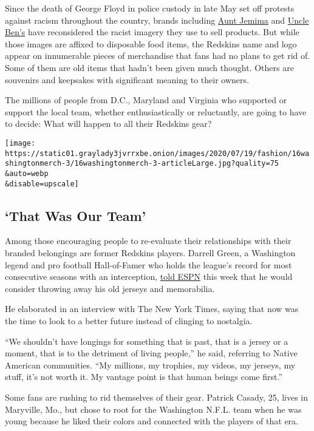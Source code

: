Since the death of George Floyd in police custody in late May set off
protests against racism throughout the country, brands including
\href{https://www.nytimes3xbfgragh.onion/2020/06/17/business/media/aunt-jemima-racial-stereotype.html}{Aunt
Jemima} and
\href{https://www.nytimes3xbfgragh.onion/2020/06/17/business/aunt-jemima-mrs-butterworth-uncle-ben.html}{Uncle
Ben's} have reconsidered the racist imagery they use to sell products.
But while those images are affixed to disposable food items, the
Redskins name and logo appear on innumerable pieces of merchandise that
fans had no plans to get rid of. Some of them are old items that hadn't
been given much thought. Others are souvenirs and keepsakes with
significant meaning to their owners.

The millions of people from D.C., Maryland and Virginia who supported or
support the local team, whether enthusiastically or reluctantly, are
going to have to decide: What will happen to all their Redskins gear?

\texttt{[image: https://static01.graylady3jvrrxbe.onion/images/2020/07/19/fashion/16washingtonmerch-3/16washingtonmerch-3-articleLarge.jpg?quality=75\\\&auto=webp\\\&disable=upscale]}

\hypertarget{that-was-our-team}{%
\subsection{`That Was Our Team'}\label{that-was-our-team}}

Among those encouraging people to re-evaluate their relationships with
their branded belongings are former Redskins players. Darrell Green, a
Washington legend and pro football Hall-of-Famer who holds the league's
record for most consecutive seasons with an interception,
\href{https://twitter.com/DanGrazianoESPN/status/1282741424820310018}{told
ESPN} this week that he would consider throwing away his old jerseys and
memorabilia.

He elaborated in an interview with The New York Times, saying that now
was the time to look to a better future instead of clinging to
nostalgia.

``We shouldn't have longings for something that is past, that is a
jersey or a moment, that is to the detriment of living people,'' he
said, referring to Native American communities. ``My millions, my
trophies, my videos, my jerseys, my stuff, it's not worth it. My vantage
point is that human beings come first.''

Some fans are rushing to rid themselves of their gear. Patrick Casady,
25, lives in Maryville, Mo., but chose to root for the Washington N.F.L.
team when he was young because he liked their colors and connected with
the players of that era.

